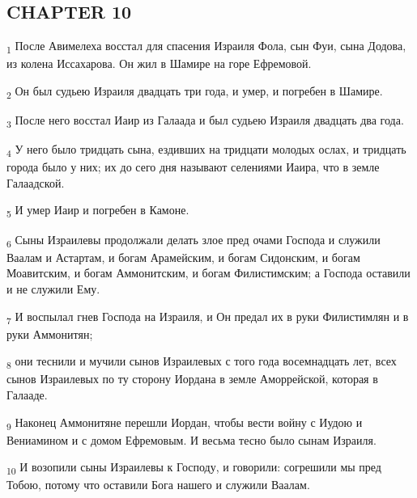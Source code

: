 \subsection{CHAPTER 10}
\begin{tcolorbox}
\textsubscript{1} После Авимелеха восстал для спасения Израиля Фола, сын Фуи, сына Додова, из колена Иссахарова. Он жил в Шамире на горе Ефремовой.
\end{tcolorbox}
\begin{tcolorbox}
\textsubscript{2} Он был судьею Израиля двадцать три года, и умер, и погребен в Шамире.
\end{tcolorbox}
\begin{tcolorbox}
\textsubscript{3} После него восстал Иаир из Галаада и был судьею Израиля двадцать два года.
\end{tcolorbox}
\begin{tcolorbox}
\textsubscript{4} У него было тридцать сына, ездивших на тридцати молодых ослах, и тридцать города было у них; их до сего дня называют селениями Иаира, что в земле Галаадской.
\end{tcolorbox}
\begin{tcolorbox}
\textsubscript{5} И умер Иаир и погребен в Камоне.
\end{tcolorbox}
\begin{tcolorbox}
\textsubscript{6} Сыны Израилевы продолжали делать злое пред очами Господа и служили Ваалам и Астартам, и богам Арамейским, и богам Сидонским, и богам Моавитским, и богам Аммонитским, и богам Филистимским; а Господа оставили и не служили Ему.
\end{tcolorbox}
\begin{tcolorbox}
\textsubscript{7} И воспылал гнев Господа на Израиля, и Он предал их в руки Филистимлян и в руки Аммонитян;
\end{tcolorbox}
\begin{tcolorbox}
\textsubscript{8} они теснили и мучили сынов Израилевых с того года восемнадцать лет, всех сынов Израилевых по ту сторону Иордана в земле Аморрейской, которая в Галааде.
\end{tcolorbox}
\begin{tcolorbox}
\textsubscript{9} Наконец Аммонитяне перешли Иордан, чтобы вести войну с Иудою и Вениамином и с домом Ефремовым. И весьма тесно было сынам Израиля.
\end{tcolorbox}
\begin{tcolorbox}
\textsubscript{10} И возопили сыны Израилевы к Господу, и говорили: согрешили мы пред Тобою, потому что оставили Бога нашего и служили Ваалам.
\end{tcolorbox}
